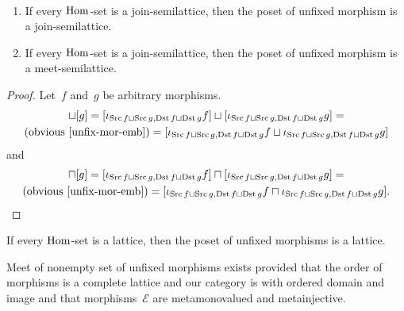 \begin{prop}
~
\begin{enumerate}
\item If every $\operatorname{Hom}$-set is a join-semilattice, then
the poset of unfixed morphism is a join-semilattice.
\item If every $\operatorname{Hom}$-set is a join-semilattice, then
the poset of unfixed morphism is a meet-semilattice.
\end{enumerate}
\end{prop}

\begin{proof}
Let~$f$ and~$g$ be arbitrary morphisms.
\begin{multline*}
[f]\sqcup[g] =
[\iota_{\Src f\sqcup\Src g,\Dst f\sqcup\Dst g}f]\sqcup
[\iota_{\Src f\sqcup\Src g,\Dst f\sqcup\Dst g}g] = \\
\text{(obvious~\ref{unfix-mor-emb})} =
[\iota_{\Src f\sqcup\Src g,\Dst f\sqcup\Dst g}f\sqcup
\iota_{\Src f\sqcup\Src g,\Dst f\sqcup\Dst g}g]
\end{multline*}
and
\begin{multline*}
[f]\sqcap[g] =
[\iota_{\Src f\sqcup\Src g,\Dst f\sqcup\Dst g}f]\sqcap
[\iota_{\Src f\sqcup\Src g,\Dst f\sqcup\Dst g}g] = \\
\text{(obvious~\ref{unfix-mor-emb})} =
[\iota_{\Src f\sqcup\Src g,\Dst f\sqcup\Dst g}f\sqcap
\iota_{\Src f\sqcup\Src g,\Dst f\sqcup\Dst g}g].
\end{multline*}
\end{proof}

\begin{cor}
If every $\operatorname{Hom}$-set is a lattice, then
the poset of unfixed morphisms is a lattice.
\end{cor}

\begin{thm}
Meet of nonempty set of unfixed morphisms
exists provided that the order of morphisms is
a complete lattice and our category is with ordered domain
and image and that morphisms~$\mathcal{E}$ are metamonovalued
and metainjective.
\end{thm}


